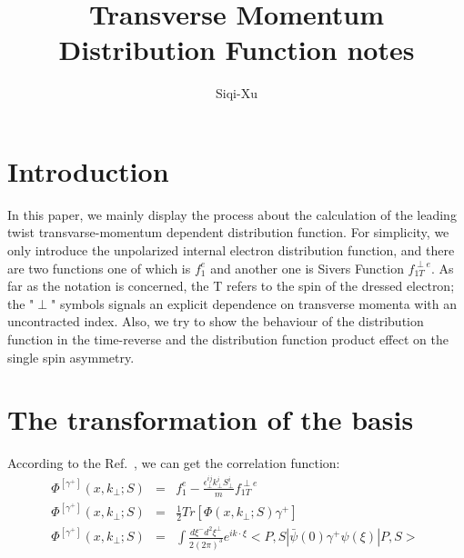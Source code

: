 \documentclass[a4paper,12pt]{article}
\begin{document}
\title{Transverse Momentum Distribution Function notes}
\author{Siqi-Xu}
\maketitle
\section{Introduction}

In this paper, we mainly display the process about the calculation of the leading twist
 transvarse-momentum dependent distribution function.
For simplicity, we only introduce the unpolarized internal electron distribution function,
 and there are two functions one of which is $f_1^e$ and another one is Sivers Function
 $f_{1T}^{\perp e}$.
As far as the notation is concerned, the T refers to the spin of the dressed electron;
 the "$\perp$" symbols signals an explicit dependence on transverse momenta with an
 uncontracted index.
Also, we try to show the behaviour of the distribution function in the time-reverse and
 the distribution function product effect on the single spin asymmetry.

\section{The transformation of the basis}

According to the Ref.~\cite{prd1}, we can get the correlation function:
\begin{eqnarray}
\Phi^{[\gamma^+]}(x,k_{\perp};S)&=& f_1^e -\frac{\epsilon^{ij}_{\perp}k^i_{\perp}S^i_{\perp}}{m}f_{1T}^{\perp e}\label{eq1.1}\\
\Phi^{[\gamma^+]}(x,k_{\perp};S)&=& \frac{1}{2}Tr[\Phi(x,k_{\perp};S)\gamma^+]\label{eq1.2}\\
\Phi^{[\gamma^+]}(x,k_{\perp};S)&=& \int \frac{d \xi^- d^2 \xi^{\perp}}{2(2\pi)^3} e^{ik \cdot \xi} <P,S|\bar{\psi}(0)\gamma^+\psi(\xi)|P,S>\label{eq1.3}\
\end{eqnarray}
\end{document}
